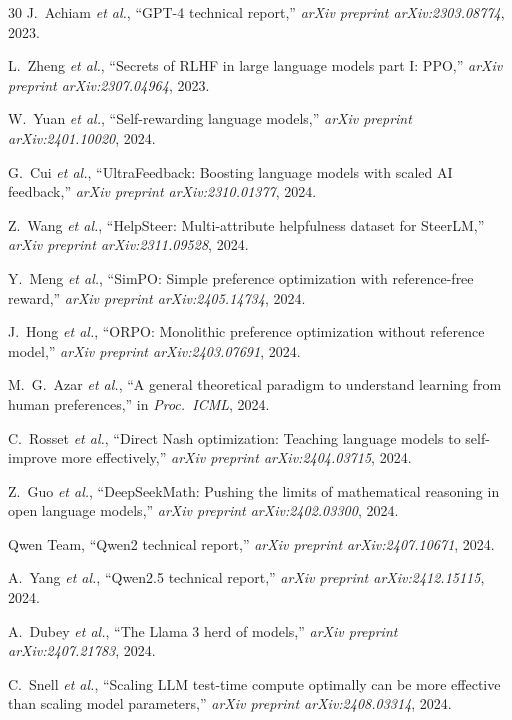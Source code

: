 \begin{thebibliography}{30}
J.~Achiam \textit{et al.}, ``GPT-4 technical report,'' \textit{arXiv preprint arXiv:2303.08774}, 2023.

L.~Zheng \textit{et al.}, ``Secrets of RLHF in large language models part I: PPO,'' \textit{arXiv preprint arXiv:2307.04964}, 2023.

W.~Yuan \textit{et al.}, ``Self-rewarding language models,'' \textit{arXiv preprint arXiv:2401.10020}, 2024.

G.~Cui \textit{et al.}, ``UltraFeedback: Boosting language models with scaled AI feedback,'' \textit{arXiv preprint arXiv:2310.01377}, 2024.

Z.~Wang \textit{et al.}, ``HelpSteer: Multi-attribute helpfulness dataset for SteerLM,'' \textit{arXiv preprint arXiv:2311.09528}, 2024.

Y.~Meng \textit{et al.}, ``SimPO: Simple preference optimization with reference-free reward,'' \textit{arXiv preprint arXiv:2405.14734}, 2024.

J.~Hong \textit{et al.}, ``ORPO: Monolithic preference optimization without reference model,'' \textit{arXiv preprint arXiv:2403.07691}, 2024.

M.~G.~Azar \textit{et al.}, ``A general theoretical paradigm to understand learning from human preferences,'' in \textit{Proc.\ ICML}, 2024.

C.~Rosset \textit{et al.}, ``Direct Nash optimization: Teaching language models to self-improve more effectively,'' \textit{arXiv preprint arXiv:2404.03715}, 2024.

Z.~Guo \textit{et al.}, ``DeepSeekMath: Pushing the limits of mathematical reasoning in open language models,'' \textit{arXiv preprint arXiv:2402.03300}, 2024.

Qwen Team, ``Qwen2 technical report,'' \textit{arXiv preprint arXiv:2407.10671}, 2024.

A.~Yang \textit{et al.}, ``Qwen2.5 technical report,'' \textit{arXiv preprint arXiv:2412.15115}, 2024.

A.~Dubey \textit{et al.}, ``The Llama 3 herd of models,'' \textit{arXiv preprint arXiv:2407.21783}, 2024.

C.~Snell \textit{et al.}, ``Scaling LLM test-time compute optimally can be more effective than scaling model parameters,'' \textit{arXiv preprint arXiv:2408.03314}, 2024.


\end{thebibliography}
